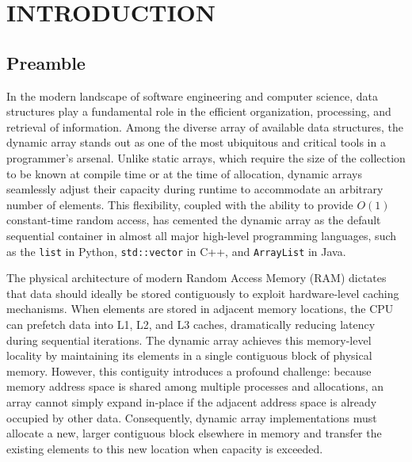\chapter{INTRODUCTION}

\section{Preamble}
In the modern landscape of software engineering and computer science, data 
structures play a fundamental role in the efficient organization, processing, 
and retrieval of information. Among the diverse array of available data 
structures, the dynamic array stands out as one of the most ubiquitous and 
critical tools in a programmer's arsenal. Unlike static arrays, which require 
the size of the collection to be known at compile time or at the time of 
allocation, dynamic arrays seamlessly adjust their capacity during runtime to 
accommodate an arbitrary number of elements. This flexibility, coupled with 
the ability to provide $O(1)$ constant-time random access, has cemented the 
dynamic array as the default sequential container in almost all major high-level 
programming languages, such as the \texttt{list} in Python, \texttt{std::vector} 
in C++, and \texttt{ArrayList} in Java.

The physical architecture of modern Random Access Memory (RAM) dictates that 
data should ideally be stored contiguously to exploit hardware-level caching 
mechanisms. When elements are stored in adjacent memory locations, the CPU 
can prefetch data into L1, L2, and L3 caches, dramatically reducing latency 
during sequential iterations. The dynamic array achieves this memory-level 
locality by maintaining its elements in a single contiguous block of physical 
memory. However, this contiguity introduces a profound challenge: because memory 
address space is shared among multiple processes and allocations, an array 
cannot simply expand in-place if the adjacent address space is already occupied 
by other data. Consequently, dynamic array implementations must allocate a new, 
larger contiguous block elsewhere in memory and transfer the existing elements 
to this new location when capacity is exceeded.

